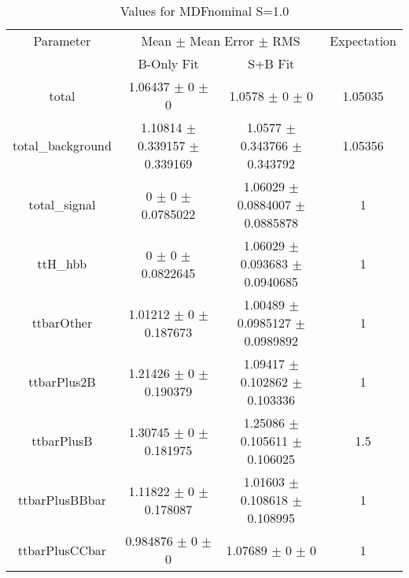 \begin{table}
\centering
\caption{Values for MDFnominal S=1.0}
\begin{tabular}{cccc}
\toprule
Parameter & \multicolumn{2}{c}{Mean $\pm$ Mean Error $\pm$ RMS} & Expectation\\
 & B-Only Fit & S+B Fit & \\
\midrule
total & \num{1.06437} $\pm$ \num{0} $\pm$ \num{0} & \num{1.0578} $\pm$ \num{0} $\pm$ \num{0} & \num{1.05035}\\
total\_background & \num{1.10814} $\pm$ \num{0.339157} $\pm$ \num{0.339169} & \num{1.0577} $\pm$ \num{0.343766} $\pm$ \num{0.343792} & \num{1.05356}\\
total\_signal & \num{0} $\pm$ \num{0} $\pm$ \num{0.0785022} & \num{1.06029} $\pm$ \num{0.0884007} $\pm$ \num{0.0885878} & \num{1}\\
ttH\_hbb & \num{0} $\pm$ \num{0} $\pm$ \num{0.0822645} & \num{1.06029} $\pm$ \num{0.093683} $\pm$ \num{0.0940685} & \num{1}\\
ttbarOther & \num{1.01212} $\pm$ \num{0} $\pm$ \num{0.187673} & \num{1.00489} $\pm$ \num{0.0985127} $\pm$ \num{0.0989892} & \num{1}\\
ttbarPlus2B & \num{1.21426} $\pm$ \num{0} $\pm$ \num{0.190379} & \num{1.09417} $\pm$ \num{0.102862} $\pm$ \num{0.103336} & \num{1}\\
ttbarPlusB & \num{1.30745} $\pm$ \num{0} $\pm$ \num{0.181975} & \num{1.25086} $\pm$ \num{0.105611} $\pm$ \num{0.106025} & \num{1.5}\\
ttbarPlusBBbar & \num{1.11822} $\pm$ \num{0} $\pm$ \num{0.178087} & \num{1.01603} $\pm$ \num{0.108618} $\pm$ \num{0.108995} & \num{1}\\
ttbarPlusCCbar & \num{0.984876} $\pm$ \num{0} $\pm$ \num{0} & \num{1.07689} $\pm$ \num{0} $\pm$ \num{0} & \num{1}\\
\bottomrule
\end{tabular}
\end{table}